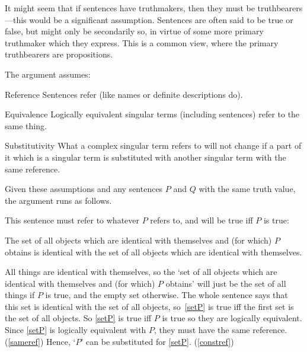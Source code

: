 It might seem that if sentences have truthmakers, then they must be truthbearers---this would be a significant assumption.
Sentences are often said to be true or false, but might only be secondarily so, in virtue of some more primary truthmaker which they express.
This is a common view, where the primary truthbearers are propositions.

The argument assumes:
\parencite[753]{Davidson_1969}

	\begin{principle}{Reference}\label{srefer}
	Sentences refer (like names or definite descriptions do).
	\end{principle}

	\begin{principle}{Equivalence}\label{sameref}
	Logically equivalent singular terms (including sentences) refer to the same thing.
	\end{principle}

	\begin{principle}{Substitutivity}\label{constref}
	What a complex singular term refers to will not change if a part of it which is a singular term is substituted with another singular term with the same reference.
	\end{principle}


Given these assumptions and any sentences $P$ and $Q$ with the same truth value, the argument runs as follows.

This sentence must refer to whatever $P$ refers to, and will be true iff $P$ is true:

	\begin{example} \label{setP}
	The set of all objects which are identical with themselves and (for which) $P$ obtains is identical with the set of all objects which are identical with themselves.
	\end{example}

All things are identical with themselves, so the `set of all objects which are identical with themselves and (for which) $P$ obtains' will just be the set of all things if $P$ is true, and the empty set otherwise.
The whole sentence says that this set is identical with the set of all objects, so~\ref{setP} is true iff the first set is the set of all objects.
So \ref{setP} is true iff $P$ is true so they are logically equivalent.
Since \ref{setP} is logically equivalent with $P$, they must have the same reference.
(\ref{sameref})
Hence, `$P$' can be substituted for \ref{setP}.
(\ref{constref})

